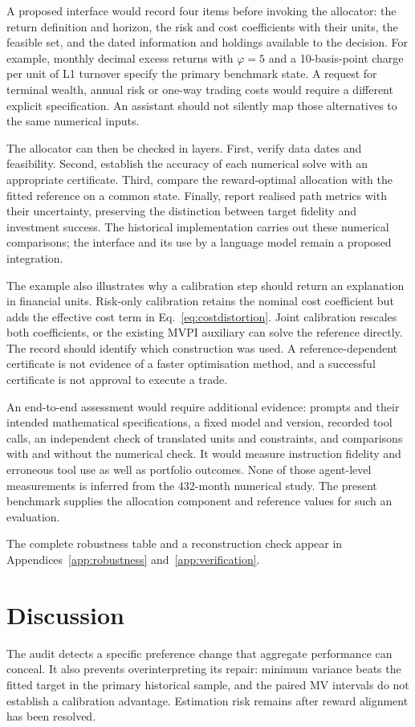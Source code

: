 \documentclass[sigconf,anonymous,review]{acmart}
\begin{document}
A proposed interface would record four items before invoking the allocator: the return definition and horizon, the risk and cost coefficients with their units, the feasible set, and the dated information and holdings available to the decision. For example, monthly decimal excess returns with $\varphi=5$ and a 10-basis-point charge per unit of L1 turnover specify the primary benchmark state. A request for terminal wealth, annual risk or one-way trading costs would require a different explicit specification. An assistant should not silently map those alternatives to the same numerical inputs.

The allocator can then be checked in layers. First, verify data dates and feasibility. Second, establish the accuracy of each numerical solve with an appropriate certificate. Third, compare the reward-optimal allocation with the fitted reference on a common state. Finally, report realised path metrics with their uncertainty, preserving the distinction between target fidelity and investment success. The historical implementation carries out these numerical comparisons; the interface and its use by a language model remain a proposed integration.

The example also illustrates why a calibration step should return an explanation in financial units. Risk-only calibration retains the nominal cost coefficient but adds the effective cost term in Eq.\ \eqref{eq:costdistortion}. Joint calibration rescales both coefficients, or the existing MVPI auxiliary can solve the reference directly. The record should identify which construction was used. A reference-dependent certificate is not evidence of a faster optimisation method, and a successful certificate is not approval to execute a trade.

An end-to-end assessment would require additional evidence: prompts and their intended mathematical specifications, a fixed model and version, recorded tool calls, an independent check of translated units and constraints, and comparisons with and without the numerical check. It would measure instruction fidelity and erroneous tool use as well as portfolio outcomes. None of those agent-level measurements is inferred from the 432-month numerical study. The present benchmark supplies the allocation component and reference values for such an evaluation.

The complete robustness table and a reconstruction check appear in Appendices~\ref{app:robustness} and~\ref{app:verification}.

\balance
\section{Discussion}
The audit detects a specific preference change that aggregate performance can conceal. It also prevents overinterpreting its repair: minimum variance beats the fitted target in the primary historical sample, and the paired MV intervals do not establish a calibration advantage. Estimation risk remains after reward alignment has been resolved.
\end{document}
